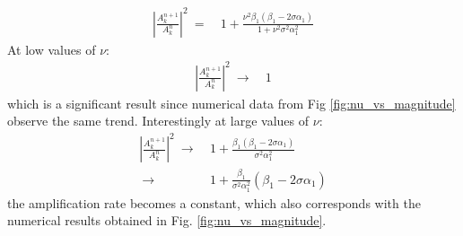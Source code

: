 \documentclass[conf]{new-aiaa}
\begin{document}
{{\begin{equation}
	\begin{split}
		\label{eq:Fourier_Mode_Sigma}
  			\left|\frac{A_k^{n+1}}{A_k^{n}} \right|^2~=&~1+\frac{\nu^2\beta_1\left(\beta_1-2\sigma\alpha_1\right)}{1+\nu^2\sigma^2\alpha_1^2}
	\end{split}
\end{equation}
At low values of $\nu$:
\begin{equation*}
	\begin{split}
		\left|\frac{A_k^{n+1}}{A_k^{n}} \right|^2~\to&~1
	\end{split}
\end{equation*}
which is a significant result since numerical data from Fig \ref{fig:nu_vs_magnitude} observe the same trend. 
Interestingly at large values of $\nu$:
\begin{equation*}
	\begin{split}
		\left|\frac{A_k^{n+1}}{A_k^{n}} \right|^2~\to&~1+\frac{\beta_1\left(\beta_1-2\sigma\alpha_1\right)}{\sigma^2\alpha_1^2} \\
		~\to&~1+\frac{\beta_1}{\sigma^2\alpha_1^2}\left(\beta_1-2\sigma\alpha_1\right)
	\end{split}
\end{equation*}
the amplification rate becomes a constant, which also corresponds with the numerical results obtained in Fig. \ref{fig:nu_vs_magnitude}. 

}}
\end{document}
